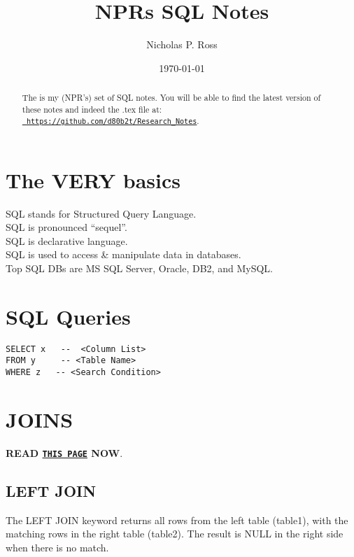 \documentclass[11pt,a4paper]{article}
\begin{document}
\title{NPRs SQL Notes}
\author{Nicholas P. Ross}
\date{\today}
\maketitle




\begin{abstract}
The is my (NPR's) set of SQL notes.  
You will be able to find the latest version of these notes
and indeed the .tex file at:\\
\href{https://github.com/d80b2t/Research\_Notes}{\tt
https://github.com/d80b2t/Research\_Notes}.
\end{abstract}


\newpage
\tableofcontents


\newpage
\section{The VERY basics}
SQL stands for Structured Query Language.\\
SQL is pronounced ``sequel''.\\
SQL is declarative language.\\
SQL is used to access \& manipulate data in databases.\\
Top SQL DBs are MS SQL Server, Oracle, DB2, and MySQL. \\


\newpage
\section{SQL Queries}
\begin{lstlisting}
SELECT x   --  <Column List>
FROM y     -- <Table Name>
WHERE z   -- <Search Condition>
\end{lstlisting}

\newpage
\section{JOINS}
{\bf READ
\href{https://blog.codinghorror.com/a-visual-explanation-of-sql-joins/}{{\tt THIS PAGE}} NOW}. 

    \subsection{LEFT JOIN}
    The LEFT JOIN keyword returns all rows from the left table
    (table1), with the matching rows in the right table (table2). The
    result is NULL in the right side when there is no match.
    
\end{document}
